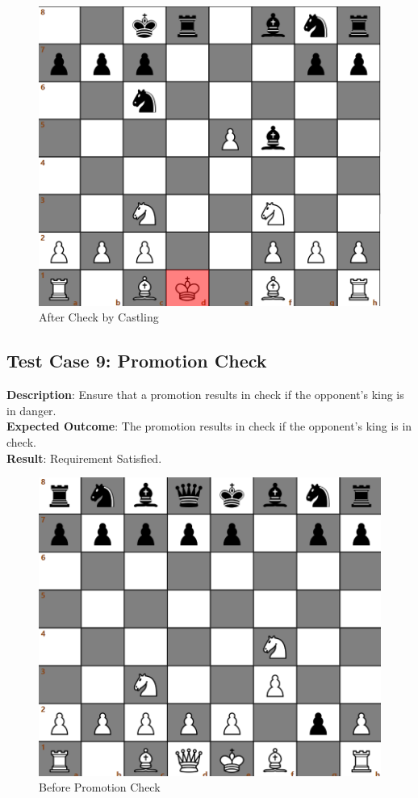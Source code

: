 \documentclass[a4paper,12pt]{article}
\begin{document}
\begin{figure}[H]
    \centering
    \includegraphics[width=0.6\linewidth]{Images/Test Cases/testCase8Img2.png}
    \caption{After Check by Castling}
    \label{fig:AfterCheckByCastling}
\end{figure}

\subsection{Test Case 9: Promotion Check}
\textbf{Description}: Ensure that a promotion results in check if the opponent's king is in danger.\\
\textbf{Expected Outcome}: The promotion results in check if the opponent's king is in check.\\
\textbf{Result}: Requirement Satisfied.

\begin{figure}[H]
    \centering
    \includegraphics[width=0.6\linewidth]{Images/Test Cases/testCase9Img1.png}
    \caption{Before Promotion Check}
    \label{fig:BeforePromotionCheck}
\end{figure}
\end{document}
